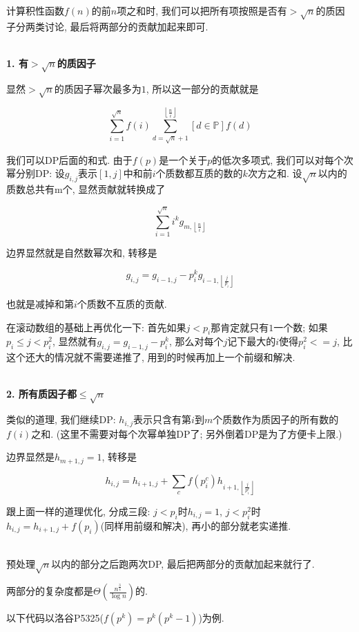 计算积性函数$f(n)$的前$n$项之和时, 我们可以把所有项按照是否有$> \sqrt n$的质因子分两类讨论, 最后将两部分的贡献加起来即可.

~\\

\textbf{1. 有$> \sqrt n$的质因子}

显然$> \sqrt n$的质因子幂次最多为$1$, 所以这一部分的贡献就是

$$ \sum_{i = 1} ^ {\sqrt n} f(i) \sum_{d = \sqrt n + 1} ^ {\left\lfloor \frac n i \right\rfloor} \left[ d \in \mathbb{P} \right] f(d) $$

我们可以DP后面的和式. 由于$f(p)$是一个关于$p$的低次多项式, 我们可以对每个次幂分别DP: 设$g_{i, j}$表示$[1, j]$中和前$i$个质数都互质的数的$k$次方之和. 设$\sqrt n$以内的质数总共有m个, 显然贡献就转换成了

$$ \sum_{i = 1} ^ {\sqrt n} i ^ k g_{m, \left\lfloor \frac n i \right\rfloor} $$

边界显然就是自然数幂次和, 转移是

$$ g_{i, j} = g_{i - 1, j} - p_i ^ k g_{i - 1, \left\lfloor \frac j {p_i} \right\rfloor} $$

也就是减掉和第$i$个质数不互质的贡献.

在滚动数组的基础上再优化一下: 首先如果$j < p_i$那肯定就只有$1$一个数; 如果$p_i \le j < p_i ^ 2$, 显然就有$g_{i, j} = g_{i - 1, j} - p_i ^ k$, 那么对每个$j$记下最大的$i$使得$p_i ^ 2 <= j$, 比这个还大的情况就不需要递推了, 用到的时候再加上一个前缀和解决.

~\\

\textbf{2. 所有质因子都$\le \sqrt n$}

类似的道理, 我们继续DP: $h_{i, j}$表示只含有第$i$到$m$个质数作为质因子的所有数的$f(i)$之和. (这里不需要对每个次幂单独DP了; 另外倒着DP是为了方便卡上限.)

边界显然是$h_{m + 1, j} = 1$, 转移是

$$ h_{i, j} = h_{i + 1, j} + \sum_{c} f(p_i ^ c) h_{i + 1, \left\lfloor \frac j {p_i ^ c} \right\rfloor} $$

跟上面一样的道理优化, 分成三段: $j < p_i$时$h_{i, j} = 1$, $j < p_i ^ 2$时$h_{i, j} = h_{i + 1, j} + f(p_i)$(同样用前缀和解决), 再小的部分就老实递推.

~\\

预处理$\sqrt n$以内的部分之后跑两次DP, 最后把两部分的贡献加起来就行了.

两部分的复杂度都是$\Theta \left( \frac {n ^ {\frac 3 4}} {\log n} \right)$的.

以下代码以洛谷P5325($f(p^k) = p^k (p^k - 1)$)为例.

\inputminted{cpp}{../src/numbertheory/洲阁筛.cpp}